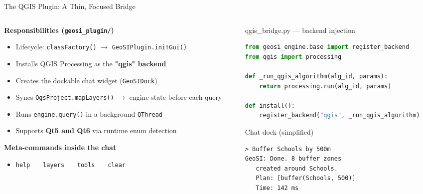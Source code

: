 \documentclass[aspectratio=169,11pt]{beamer}
\newcommand{\kw}[1]{{\color{geositeal}\bfseries #1}}
\begin{document}
\begin{frame}{The QGIS Plugin: A Thin, Focused Bridge}
  \begin{columns}[T,onlytextwidth]
    \begin{column}{0.55\textwidth}
      \small
      \textbf{Responsibilities (\texttt{geosi\_plugin/})}
      \begin{itemize}
        \item Lifecycle: \texttt{classFactory()} $\rightarrow$ \texttt{GeoSIPlugin.initGui()}
        \item Installs QGIS Processing as the \kw{"qgis" backend}
        \item Creates the dockable chat widget (\texttt{GeoSIDock})
        \item Syncs \texttt{QgsProject.mapLayers()} $\rightarrow$ engine state before each query
        \item Runs \texttt{engine.query()} in a background \texttt{QThread}
        \item Supports \kw{Qt5 and Qt6} via runtime enum detection
      \end{itemize}

      \textbf{Meta-commands inside the chat}
      \begin{itemize}
        \item \texttt{help} \ \textbullet\ \ \texttt{layers} \ \textbullet\ \ \texttt{tools} \ \textbullet\ \ \texttt{clear}
      \end{itemize}
    \end{column}
    \begin{column}{0.45\textwidth}
      \begin{block}{qgis\_bridge.py --- backend injection}
\begin{lstlisting}[language=Python]
from geosi_engine.base import register_backend
from qgis import processing

def _run_qgis_algorithm(alg_id, params):
    return processing.run(alg_id, params)

def install():
    register_backend("qgis", _run_qgis_algorithm)
\end{lstlisting}
      \end{block}
      \vspace{-0.3em}
      \begin{block}{Chat dock (simplified)}
\begin{lstlisting}[style=chat]
> Buffer Schools by 500m
GeoSI: Done. 8 buffer zones
   created around Schools.
   Plan: [buffer(Schools, 500)]
   Time: 142 ms
\end{lstlisting}
      \end{block}
    \end{column}
  \end{columns}
\end{frame}
\end{document}

